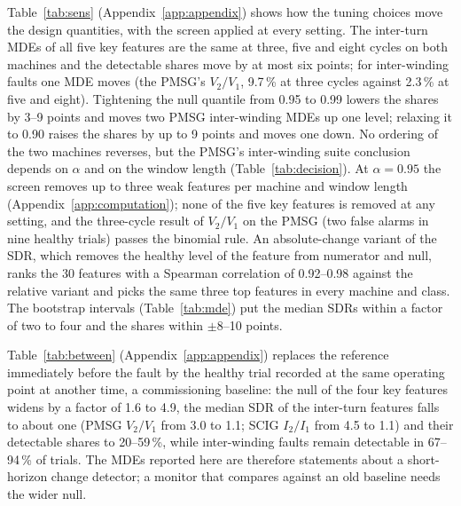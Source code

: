 Table~\ref{tab:sens} (Appendix~\ref{app:appendix}) shows how the tuning choices move the design quantities, with the screen applied at every setting. The inter-turn MDEs of all five key features are the same at three, five and eight cycles on both machines and the detectable shares move by at most six points; for inter-winding faults one MDE moves (the PMSG's $V_2/V_1$, 9.7\,\% at three cycles against 2.3\,\% at five and eight). Tightening the null quantile from 0.95 to 0.99 lowers the shares by 3--9 points and moves two PMSG inter-winding MDEs up one level; relaxing it to 0.90 raises the shares by up to 9 points and moves one down. No ordering of the two machines reverses, but the PMSG's inter-winding suite conclusion depends on $\alpha$ and on the window length (Table~\ref{tab:decision}). At $\alpha=0.95$ the screen removes up to three weak features per machine and window length (Appendix~\ref{app:computation}); none of the five key features is removed at any setting, and the three-cycle result of $V_2/V_1$ on the PMSG (two false alarms in nine healthy trials) passes the binomial rule. An absolute-change variant of the SDR, which removes the healthy level of the feature from numerator and null, ranks the 30 features with a Spearman correlation of 0.92--0.98 against the relative variant and picks the same three top features in every machine and class. The bootstrap intervals (Table~\ref{tab:mde}) put the median SDRs within a factor of two to four and the shares within $\pm$8--10 points.

Table~\ref{tab:between} (Appendix~\ref{app:appendix}) replaces the reference immediately before the fault by the healthy trial recorded at the same operating point at another time, a commissioning baseline: the null of the four key features widens by a factor of 1.6 to 4.9, the median SDR of the inter-turn features falls to about one (PMSG $V_2/V_1$ from 3.0 to 1.1; SCIG $I_2/I_1$ from 4.5 to 1.1) and their detectable shares to 20--59\,\%, while inter-winding faults remain detectable in 67--94\,\% of trials. The MDEs reported here are therefore statements about a short-horizon change detector; a monitor that compares against an old baseline needs the wider null.
